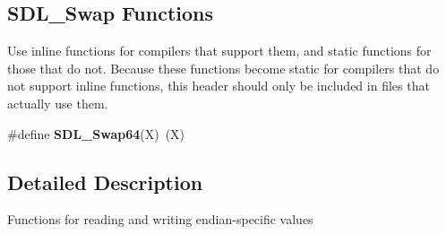 \subsection*{S\+D\+L\+\_\+\+Swap Functions}
\label{_amgrp968b97fa28abb0c5b2838d418c0fd83f}%
Use inline functions for compilers that support them, and static functions for those that do not. Because these functions become static for compilers that do not support inline functions, this header should only be included in files that actually use them. \begin{DoxyCompactItemize}
\item 
\#define {\bfseries S\+D\+L\+\_\+\+Swap64}(X)~(X)\label{_s_d_l__endian_8h_a970862b2724f36e7c52fda401022b669}

\end{DoxyCompactItemize}


\subsection{Detailed Description}
Functions for reading and writing endian-\/specific values 